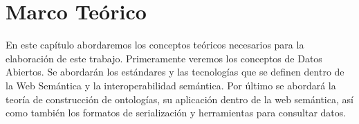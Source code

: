 \chapter{Marco Teórico}
\label{chap:Marco Teorico}

En este capítulo abordaremos los conceptos teóricos necesarios para la elaboración de este trabajo. Primeramente veremos los conceptos de Datos Abiertos. Se abordarán los estándares y las tecnologías que se definen dentro de la Web Semántica y la interoperabilidad semántica. Por último se abordará la teoría de construcción de ontologías, su aplicación dentro de la web semántica, así como también los formatos de serialización y herramientas para consultar datos.






